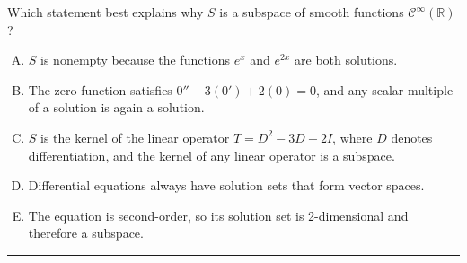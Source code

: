 \documentclass[12pt]{amsart}
\newcommand{\divider}{
  \vspace{-1em} %
  \noindent
  \raisebox{-0.15ex}{\textbullet}%
  \hspace{0.5em}%
  \rule[0.5ex]{0.95\textwidth}{1.0pt}%
  \hspace{0.5em}%
  \raisebox{-0.15ex}{\textbullet}%
  \vspace{0em} %
}
\begin{document}
Which statement best explains why $S$ is a subspace of smooth functions $\mathcal{C}^\infty(\mathbb{R})$?

\begin{enumerate}[(A)]
\item $S$ is nonempty because the functions $e^x$ and $e^{2x}$ are both solutions.
\item The zero function satisfies $0'' - 3(0') + 2(0) = 0$, and any scalar multiple of a solution is again a solution.
\item $S$ is the kernel of the linear operator $T = D^2 - 3D + 2I$, where $D$ denotes differentiation, and the kernel of any linear operator is a subspace.
\item Differential equations always have solution sets that form vector spaces.
\item The equation is second-order, so its solution set is 2-dimensional and therefore a subspace.
\end{enumerate}


\divider


\newpage
\end{document}
